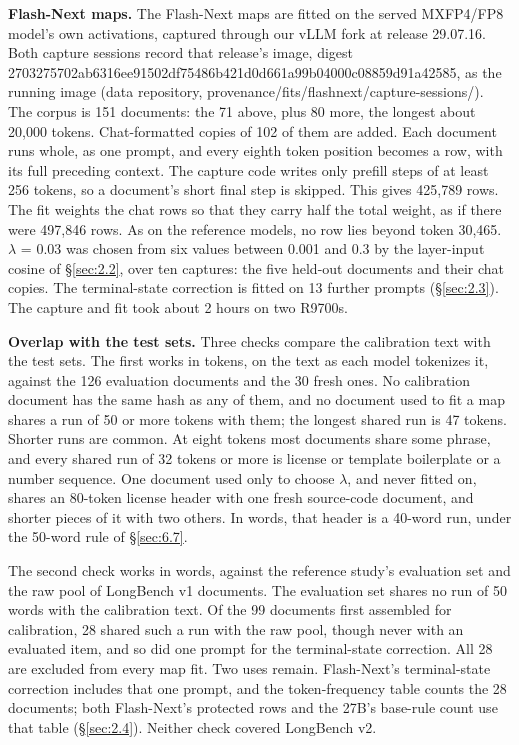 \documentclass[11pt]{article}
\begin{document}
\textbf{Flash-Next maps.} The Flash-Next maps are fitted on the served MXFP4/FP8 model's own activations, captured through our vLLM fork at release 29.07.16. Both capture sessions record that release's image, digest 2703275702ab6316ee91502df75486b421d0d661a99b04000c08859d91a42585, as the running image (data repository, provenance/fits/flashnext/capture-sessions/). The corpus is 151 documents: the 71 above, plus 80 more, the longest about 20,000 tokens. Chat-formatted copies of 102 of them are added. Each document runs whole, as one prompt, and every eighth token position becomes a row, with its full preceding context. The capture code writes only prefill steps of at least 256 tokens, so a document's short final step is skipped. This gives 425,789 rows. The fit weights the chat rows so that they carry half the total weight, as if there were 497,846 rows. As on the reference models, no row lies beyond token 30,465. $\lambda$ = 0.03 was chosen from six values between 0.001 and 0.3 by the layer-input cosine of \S\ref{sec:2.2}, over ten captures: the five held-out documents and their chat copies. The terminal-state correction is fitted on 13 further prompts (\S\ref{sec:2.3}). The capture and fit took about 2 hours on two R9700s.

\textbf{Overlap with the test sets.} Three checks compare the calibration text with the test sets. The first works in tokens, on the text as each model tokenizes it, against the 126 evaluation documents and the 30 fresh ones. No calibration document has the same hash as any of them, and no document used to fit a map shares a run of 50 or more tokens with them; the longest shared run is 47 tokens. Shorter runs are common. At eight tokens most documents share some phrase, and every shared run of 32 tokens or more is license or template boilerplate or a number sequence. One document used only to choose $\lambda$, and never fitted on, shares an 80-token license header with one fresh source-code document, and shorter pieces of it with two others. In words, that header is a 40-word run, under the 50-word rule of \S\ref{sec:6.7}.

The second check works in words, against the reference study's evaluation set and the raw pool of LongBench v1 documents. The evaluation set shares no run of 50 words with the calibration text. Of the 99 documents first assembled for calibration, 28 shared such a run with the raw pool, though never with an evaluated item, and so did one prompt for the terminal-state correction. All 28 are excluded from every map fit. Two uses remain. Flash-Next's terminal-state correction includes that one prompt, and the token-frequency table counts the 28 documents; both Flash-Next's protected rows and the 27B's base-rule count use that table (\S\ref{sec:2.4}). Neither check covered LongBench v2.
\end{document}
